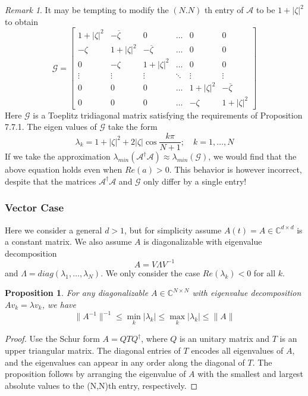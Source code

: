 \documentclass[12pt, oneside]{book}
\newtheorem{proposition}[theorem]{Proposition}
\theoremstyle{definition}
\theoremstyle{definition}
\theoremstyle{remark}
\newtheorem*{remark}{Remark}
\begin{document}
\begin{remark}
    It may be tempting to modify the $(N.N)$ th entry of $\mathcal{A}$ to be $1+|\zeta|^2$ to obtain
    \[
    \mathcal{G}=\begin{bmatrix} 1+ |\zeta|^2 & -\overline{\zeta} & 0 & \ldots & 0 & 0 \\ -\zeta & 1+|\zeta|^2 & -\overline{\zeta} & \ldots & 0 & 0\\
    0 & -\zeta & 1+|\zeta|^2 & \ldots & 0 & 0 \\
    \vdots & \vdots & \vdots & \ddots & \vdots & \vdots \\
    0 & 0 & 0 & \ldots & 1+|\zeta|^2 & -\overline{\zeta} \\
    0 & 0 & 0 & \ldots & -\zeta & 1+|\zeta|^2 \end{bmatrix}
    \]
    Here $\mathcal{G}$ is a Toeplitz tridiagonal matrix satisfying the requirements of Proposition 7.7.1. The eigen values of $\mathcal{G}$ take the form
    \[
    \lambda_k=1+|\zeta|^2+2|\zeta|\cos \frac{k\pi}{N+1};\quad k=1,\ldots,N
    \]
    If we take the approximation $\lambda_{min}(\mathcal{A}^{\dagger}\mathcal{A})\approx \lambda_{min}(\mathcal{G})$, we would find that the above equation holds even when $Re(a)>0$. This behavior is however incorrect, despite that the matrices $\mathcal{A}^{\dagger}\mathcal{A}$ and $\mathcal{G}$ only differ by a single entry!
\end{remark}

\subsubsection{Vector Case}
Here we consider a general $d>1$, but for simplicity assume $A(t)=A \in \mathbb{C}^{d \times d}$ is a constant matrix. We also assume $A$ is diagonalizable with eigenvalue decomposition
\[
A=V\Lambda V^{-1}
\]
and $\Lambda=diag(\lambda_1,\ldots,\lambda_N)$. We only consider the case $Re(\lambda_k) < 0$ for all $k$.
\begin{proposition}
    For any diagonalizable $A \in \mathbb{C}^{N \times N}$ with eigenvalue decomposition $Av_k=\lambda v_k$, we have
    \[
    \|A^{-1}\|^{-1}\leq \min_k|\lambda_k|\leq \max_k|\lambda_k|\leq \|A\|
    \]
\end{proposition}
\begin{proof}
    Use the Schur form $A=QTQ^{\dagger}$, where $Q$ is an unitary matrix and $T$ is an upper triangular matrix. The diagonal entries of $T$ encodes all eigenvalues of $A$, and the eigenvalues can appear in any order along the diagonal of $T$. The proposition follows by arranging the eigenvalue of $A$ with the smallest and largest absolute values to the (N,N)th entry, respectively. 
\end{proof}
\end{document}
